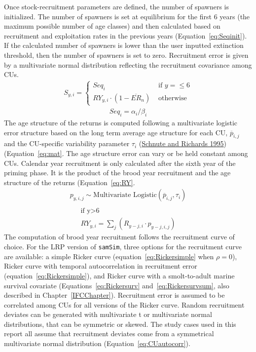 \documentclass[11pt]{book}
\begin{document}
Once stock-recruitment parameters are defined, the number of spawners is initialized. The number of spawners is set at equilibrium for the first 6 years (the maximum possible number of age classes) and then calculated based on recruitment and exploitation rates in the previous years (Equation~\ref{eq:Seqinit}). If the calculated number of spawners is lower than the user inputted extinction threshold, then the number of spawners is set to zero. Recruitment error is given by a multivariate normal distribution reflecting the recruitment covariance among CUs.
\begin{align}
S_{y,i} =
 \begin{cases}
   Seq_{i} &\text{ if } y = \leq 6\\
   RY_{y,i} \cdot (1 - \overline{ER}_{n}) &\text{ otherwise}
  \end{cases}
  \label{eq:Seqinit}
\end{align}
\begin{align}
Seq_{i} = \alpha_{i}/\beta_{i}
\label{eq:Seq}
\end{align}
The age structure of the returns is computed following a multivariate logistic error structure based on the long term average age structure for each CU, \(\overline{p}_{i,j}\) and the CU-specific variability parameter \(\tau_i\) (\protect\hyperlink{ref-schnuteInfluenceErrorPopulation1995}{Schnute and Richards 1995}) (Equation~\ref{eq:mat}. The age structure error can vary or be held constant among CUs. Calendar year recruitment is only calculated after the sixth year of the priming phase. It is the product of the brood year recruitment and the age structure of the returns (Equation~\ref{eq:RY}.
\begin{align}
  p_{y,i,j} \sim \text{Multivariate Logistic}(\overline{p}_{i,j},\tau_{i}) \\
  \label{eq:mat}
\end{align}
\begin{align}
\text{if y>6}\\
  RY_{y,i} = \sum_j(R_{y-j,i} \cdot p_{y-j,i,j})
  \label{eq:RY}
\end{align}
The computation of brood year recruitment follows the recruitment curve of choice. For the LRP version of \texttt{samSim}, three options for the recruitment curve are available: a simple Ricker curve (equation~\ref{eq:Rickersimple} when \(\rho = 0\)), Ricker curve with temporal autocorrelation in recruitment error (equation~\ref{eq:Rickersimple}), and Ricker curve with a smolt-to-adult marine survival covariate (Equations~\ref{eq:Rickersurv} and~\ref{eq:Rickersurvsum}, also described in Chapter~\ref{IFCChapter}). Recruitment error is assumed to be correlated among CUs for all versions of the Ricker curve. Random recruitment deviates can be generated with multivariate t or multivariate normal distributions, that can be symmetric or skewed. The study cases used in this report all assume that recruitment deviates come from a symmetrical multivariate normal distribution (Equation~\ref{eq:CUautocorr}).
\end{document}
